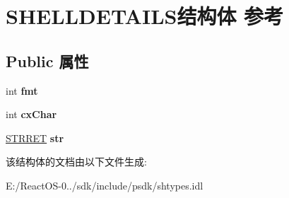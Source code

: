 \hypertarget{struct_s_h_e_l_l_d_e_t_a_i_l_s}{}\section{S\+H\+E\+L\+L\+D\+E\+T\+A\+I\+L\+S结构体 参考}
\label{struct_s_h_e_l_l_d_e_t_a_i_l_s}
\subsection*{Public 属性}
\begin{DoxyCompactItemize}
\item 
\mbox{\label{struct_s_h_e_l_l_d_e_t_a_i_l_s_ac782d2b707ed97d261a76cb8a677f8ca}} 
int {\bfseries fmt}
\item 
\mbox{\label{struct_s_h_e_l_l_d_e_t_a_i_l_s_a5a8e094f53a174707b6cde9a43f1360c}} 
int {\bfseries cx\+Char}
\item 
\mbox{\label{struct_s_h_e_l_l_d_e_t_a_i_l_s_a4d3ef8f906b69345a6e49177f1330ff8}} 
\hyperlink{struct___s_t_r_r_e_t}{S\+T\+R\+R\+ET} {\bfseries str}
\end{DoxyCompactItemize}


该结构体的文档由以下文件生成\+:\begin{DoxyCompactItemize}
\item 
E\+:/\+React\+O\+S-\/0../sdk/include/psdk/shtypes.\+idl\end{DoxyCompactItemize}
